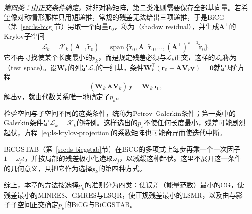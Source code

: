 \emph{第四类：由正交条件确定。}对非对称矩阵，第二类准则需要保存全部基向量。若希望像对称情形那样只用短递推，常规的残差无法给出三项递推，于是BiCG（第~\ref{sec:ls-bicg}节）另取一个向量$\widetilde{\bm r}_0$，称为（shadow residual），并生成$\bm A^\top$的Krylov子空间
\begin{equation}
 \mathcal L_k=\mathcal K_k(\bm A^\top,\widetilde{\bm r}_0)=\operatorname{span}\{\widetilde{\bm r}_0,\bm A^\top\widetilde{\bm r}_0,\ldots,(\bm A^\top)^{k-1}\widetilde{\bm r}_0\}.
 \label{eq:ls-krylov-test-space}
\end{equation}
它不再寻找使某个长度最小的$p_k$，而是规定残差必须与$\mathcal L_k$正交，这样的$\mathcal L_k$称为（test space）。设$\bm W_k$的列是$\mathcal L_k$的一组基，条件$\bm W_k^\top(\bm r_0-\bm A\bm V_k\bm y)=\bm0$就是$k$阶方程
\begin{equation}
 (\bm W_k^\top\bm A\bm V_k)\,\bm y=\bm W_k^\top\bm r_0 ,
 \label{eq:ls-krylov-projection}
\end{equation}
解出$\bm y$，就由代数关系唯一地确定了$p_k$。

检验空间与子空间不同的这类条件，统称为Petrov--Galerkin条件；第一类中的Galerkin条件是$\mathcal L_k=\mathcal K_k$的特例。这样选出的$p_k$不使任何长度最小，残差可能剧烈起伏，方程~\eqref{eq:ls-krylov-projection}的系数矩阵也可能奇异而使迭代中断。

BiCGSTAB（第~\ref{sec:ls-bicgstab}节）在BiCG的多项式上每步再乘一个一次因子$1-\omega_jt$，并按局部的残差极小化选取$\omega_j$，以减缓这种起伏。这里不展开这一条件的几何意义，只把它作为选择$p_k$的第四种方式。

综上，本章的方法按选择$p_k$的准则分为四类：使误差（能量范数）最小的CG，使残差最小的MINRES、GMRES与LSQR，使正规残差最小的LSMR，以及由与影子子空间正交确定$p_k$的BiCG与BiCGSTAB。
